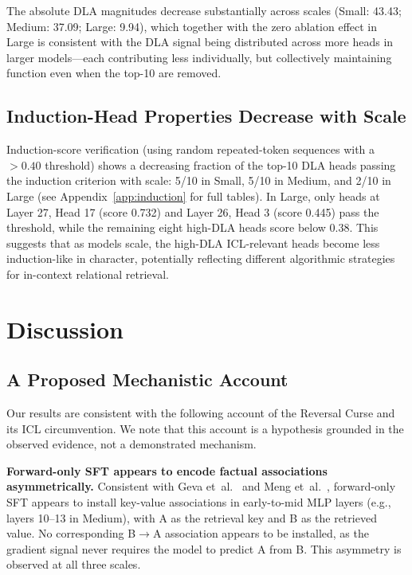\documentclass[11pt]{article}
\begin{document}
The absolute DLA magnitudes decrease substantially across scales (Small: 43.43;
Medium: 37.09; Large: 9.94), which together with the zero ablation effect in
Large is consistent with the DLA signal being distributed across more heads in
larger models---each contributing less individually, but collectively maintaining
function even when the top-10 are removed.

\subsection{Induction-Head Properties Decrease with Scale}

Induction-score verification (using random repeated-token sequences with a
$>0.40$ threshold) shows a decreasing fraction of the top-10 DLA heads passing
the induction criterion with scale: 5/10 in Small, 5/10 in Medium, and 2/10 in
Large (see Appendix~\ref{app:induction} for full tables). In Large, only heads
at Layer 27, Head 17 (score 0.732) and Layer 26, Head 3 (score 0.445) pass the
threshold, while the remaining eight high-DLA heads score below 0.38. This
suggests that as models scale, the high-DLA ICL-relevant heads become less
induction-like in character, potentially reflecting different algorithmic
strategies for in-context relational retrieval.

\section{Discussion}
\label{sec:discussion}

\subsection{A Proposed Mechanistic Account}

Our results are consistent with the following account of the Reversal Curse
and its ICL circumvention. We note that this account is a hypothesis grounded
in the observed evidence, not a demonstrated mechanism.

\textbf{Forward-only SFT appears to encode factual associations asymmetrically.}
Consistent with Geva et~al.~\cite{geva2021transformer} and
Meng et~al.~\cite{meng2022locating}, forward-only SFT appears to install
key-value associations in early-to-mid MLP layers (e.g., layers 10--13 in
Medium), with A as the retrieval key and B as the retrieved value. No
corresponding B$\to$A association appears to be installed, as the gradient
signal never requires the model to predict A from B. This asymmetry is
observed at all three scales.
\end{document}
